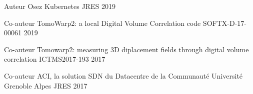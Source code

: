 

\begin{cventries}

  \cventrynodescr
    {Auteur} %
    {Osez Kubernetes} %
    {JRES} %
    {2019} %

  \cventrynodescr
    {Co-auteur} %
    {TomoWarp2: a local Digital Volume Correlation code} %
    {SOFTX-D-17-00061} %
    {2019} %

  \cventrynodescr
    {Co-auteur} %
    {Tomowarp2: measuring 3D diplacement fields through digital volume correlation} %
    {ICTMS2017-193} %
    {2017} %

  \cventrynodescr
    {Co-auteur} %
    {ACI, la solution SDN du Datacentre de la Communauté Université Grenoble Alpes} %
    {JRES} %
    {2017} %

\end{cventries}
